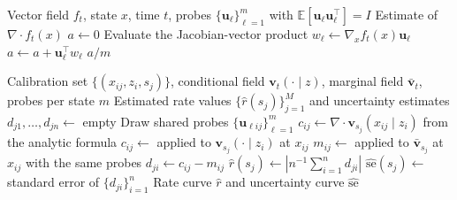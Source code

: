 \documentclass{article}
\newcommand{\E}{\mathbb{E}}
\newcommand{\vv}{\bm{v}}
\newcommand{\vu}{\bm{u}}
\newcommand{\diver}{\nabla\!\cdot}
\theoremstyle{plain}
\theoremstyle{definition}
\theoremstyle{remark}
\begin{document}
\begin{algorithm}[H]
  \caption{Hutchinson Divergence of a Vector Field}
  \label{alg:hutchinson}
  \begin{algorithmic}[1]
    \REQUIRE Vector field $f_t$, state $x$, time $t$, probes $\{\vu_\ell\}_{\ell=1}^m$ with $\E[\vu_\ell\vu_\ell^\top]=I$
    \ENSURE Estimate of $\diver f_t(x)$
    \STATE $a \leftarrow 0$
      \STATE Evaluate the Jacobian-vector product $w_\ell \leftarrow \nabla_x f_t(x)\vu_\ell$
      \STATE $a \leftarrow a + \vu_\ell^\top w_\ell$
    \ENDFOR
    \RETURN $a/m$
  \end{algorithmic}
\end{algorithm}

\begin{algorithm}[H]
  \caption{Conditional--Marginal Entropy-Rate Estimation}
  \label{alg:cm_estimator}
  \begin{algorithmic}[1]
    \REQUIRE Calibration set $\{(x_{ij},z_i,s_j)\}$, conditional field $\vv_t(\cdot\mid z)$, marginal field $\bar{\vv}_t$, probes per state $m$
    \ENSURE Estimated rate values $\{\hat r(s_j)\}_{j=1}^M$ and uncertainty estimates
      \STATE $d_{j1},\ldots,d_{jn} \leftarrow$ empty
        \STATE Draw shared probes $\{\vu_{\ell ij}\}_{\ell=1}^m$
          \STATE $c_{ij}\leftarrow \diver\vv_{s_j}(x_{ij}\mid z_i)$ from the analytic formula
        \ELSE
          \STATE $c_{ij}\leftarrow$  applied to $\vv_{s_j}(\cdot\mid z_i)$ at $x_{ij}$
        \ENDIF
        \STATE $m_{ij}\leftarrow$  applied to $\bar{\vv}_{s_j}$ at $x_{ij}$ with the same probes
        \STATE $d_{ji}\leftarrow c_{ij}-m_{ij}$
      \ENDFOR
      \STATE $\hat r(s_j)\leftarrow \left|n^{-1}\sum_{i=1}^n d_{ji}\right|$
      \STATE $\widehat{\mathrm{se}}(s_j)\leftarrow$ standard error of $\{d_{ji}\}_{i=1}^n$
    \ENDFOR
    \RETURN Rate curve $\hat r$ and uncertainty curve $\widehat{\mathrm{se}}$
  \end{algorithmic}
\end{algorithm}
\end{document}
